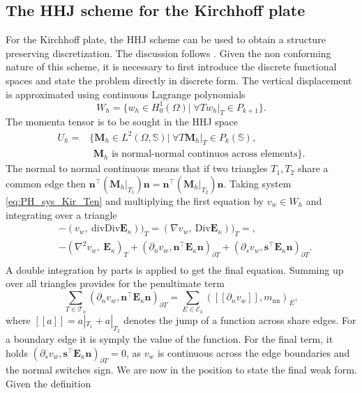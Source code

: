 \documentclass{ifacconf}
\begin{document}
\subsection{The HHJ scheme for the Kirchhoff plate}
For the Kirchhoff plate, the HHJ scheme can be used to obtain a structure preserving discretization. The discussion follows \cite{arnold2019hellan}. Given the non conforming nature of this scheme, it is necessary to first introduce the discrete functional spaces and state the problem directly in discrete form. The vertical displacement is approximated using continuous Lagrange polynomials
\[
W_h = \{w_h \in H^1_0(\Omega)| \; \forall T w_h|_{T} \in P_{k+1} \}.
\]
The momenta tensor is to be sought in the HHJ space
\begin{equation*}
\begin{aligned}
U_h = &\{\bm{M}_h \in L^2(\Omega, \mathbb{S})| \; \forall T \bm{M}_h|_{T} \in P_{k}(\mathbb{S}) , \\ &\, \ \bm{M}_h \text{ is normal-normal continuos across elements}\}.
\end{aligned}
\end{equation*}
The normal to normal continuous means that if two triangles $T_1, T_2$ share a common edge then $\bm{n}^\top (\bm{M}_h|_{T_1}) \bm{n} = \bm{n}^\top (\bm{M}_h|_{T_2}) \bm{n}$. Taking system \eqref{eq:PH_sys_Kir_Ten} and multiplying the first equation by $v_w \in W_h$ and integrating over a triangle
\begin{equation*}
	\begin{aligned}
	& - (v_w, \ \mathrm{div}\mathrm{Div} \bm{E}_\kappa))_{T} = (\nabla v_w, \ \mathrm{Div} \bm{E}_\kappa))_{T}=, \\
	& -(\nabla^2 v_w, \ \bm{E}_\kappa)_T + (\partial_n v_w, \bm{n}^\top\bm{E}_\kappa \bm{n})_{\partial T} + (\partial_s v_w, \bm{s}^\top\bm{E}_\kappa \bm{n})_{\partial T}. \\
	\end{aligned}
\end{equation*}
A double integration by parts is applied to get the final equation. Summing up over all triangles provides for the penultimate term
\begin{equation*}
\sum_{T \in \mathcal{T}_h} (\partial_n v_w, \bm{n}^\top\bm{E}_\kappa \bm{n})_{\partial T} = \sum_{E \in \mathcal{E}_h} ([\![\partial_n v_w]\!], m_{\text{nn}})_{E},
\end{equation*} 
where $[\![a]\!] = a|_{T_1} + a|_{T_2}$ denotes the jump of a function across share edges. For a boundary edge it is symply the value of the function. For the final term, it holds $(\partial_s v_w, \bm{s}^\top\bm{E}_\kappa \bm{n})_{\partial T}=0$, as $v_w$ is continuous across the edge boundaries and the normal switches sign. We are now in the position to state the final weak form. Given the definition
\end{document}
